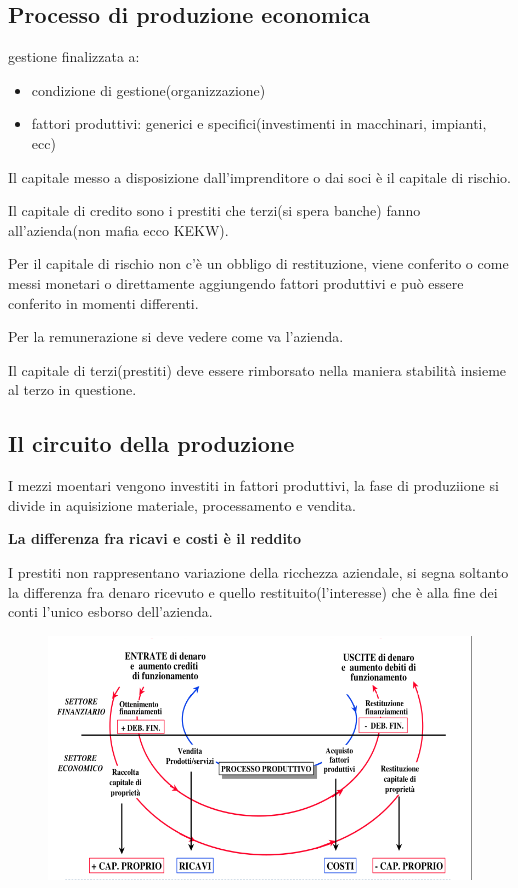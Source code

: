 \subsection{Processo di produzione economica}
gestione finalizzata a:
\begin{itemize}
    \item condizione di gestione(organizzazione)
    \item fattori produttivi: generici e specifici(investimenti in macchinari, impianti, ecc)
\end{itemize}


Il capitale messo a disposizione dall'imprenditore o dai soci è il capitale di rischio.

Il capitale di credito sono i prestiti che terzi(si spera banche) fanno all'azienda(non mafia ecco KEKW).

Per il capitale di rischio non c'è un obbligo di restituzione, viene conferito o come messi monetari
o direttamente aggiungendo fattori produttivi e può essere conferito in momenti differenti.

Per la remunerazione si deve vedere come va l'azienda.

Il capitale di terzi(prestiti) deve essere rimborsato nella maniera stabilità insieme al terzo in questione.


\subsection{Il circuito della produzione}
I mezzi moentari vengono investiti in fattori produttivi, la fase di produziione si divide in aquisizione materiale,
processamento e vendita.

\textbf{La differenza fra ricavi e costi è il reddito}


I prestiti non rappresentano variazione della ricchezza aziendale, si segna soltanto 
la differenza fra denaro ricevuto e quello restituito(l'interesse) che è alla fine dei 
conti l'unico esborso dell'azienda.



\begin{figure}[H]
    \centering
    \includegraphics[width=0.7\linewidth]{2/img/Screenshot from 2022-07-05 15-52-30.png}
\end{figure}

